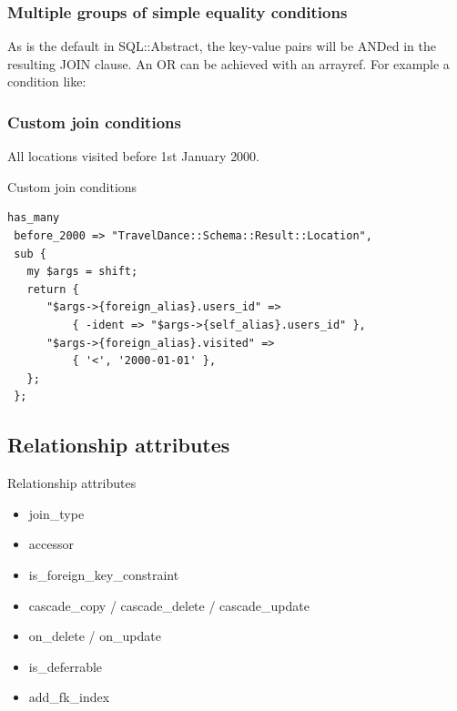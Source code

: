\subsubsection{Multiple groups of simple equality conditions}

As is the default in SQL::Abstract, the key-value pairs will be ANDed in the
resulting JOIN clause. An OR can be achieved with an arrayref. For example a
condition like:


\subsubsection{Custom join conditions}

All locations visited before 1st January 2000.

\begin{frame}[fragile]{Custom join conditions}
\begin{lstlisting}
has_many
 before_2000 => "TravelDance::Schema::Result::Location",
 sub {
   my $args = shift;
   return {
      "$args->{foreign_alias}.users_id" =>
          { -ident => "$args->{self_alias}.users_id" },
      "$args->{foreign_alias}.visited" =>
          { '<', '2000-01-01' },
   };
 };
\end{lstlisting}
\end{frame}

\subsection{Relationship attributes}


\begin{frame}{Relationship attributes}
\begin{itemize}
\item join\_type
\item accessor
\item is\_foreign\_key\_constraint
\item cascade\_copy / cascade\_delete / cascade\_update
\item on\_delete / on\_update
\item is\_deferrable
\item add\_fk\_index
\end{itemize}
\end{frame}


